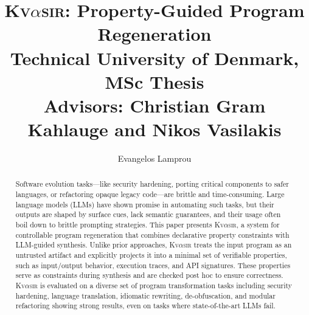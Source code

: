 \documentclass[nonacm,sigplan,review]{acmart}
\newcommand{\sys}{{\scshape Kv{$\alpha$}sir}\xspace}
\begin{document}
\title[Property-Guided Program Regeneration]{\sys: Property-Guided Program Regeneration\\{\vspace{1em}\large Technical University of Denmark, MSc Thesis {\\\vspace{-1em}} Advisors: Christian Gram Kahlauge and Nikos Vasilakis}}
\author{Evangelos Lamprou}



\begin{abstract}
  Software evolution tasks---like security hardening, porting critical components to safer 
  languages, or refactoring opaque legacy code---are brittle and time-consuming.
  Large language models (LLMs) have shown promise in automating such tasks,
  but their outputs are shaped by surface cues, lack
  semantic guarantees, and their usage often boil down to brittle prompting strategies.
This paper presents \sys, a system for controllable program regeneration that
  combines declarative property constraints with LLM-guided synthesis. Unlike
  prior approaches, \sys treats the input program as an untrusted artifact and
  explicitly projects it into a minimal set of verifiable properties, such as
  input/output behavior, execution traces, and API signatures. These properties
  serve as constraints during synthesis and are checked post hoc to ensure
  correctness.
\sys is evaluated on a diverse set of program transformation tasks
including security hardening, language translation, idiomatic rewriting, de-obfuscation,
and modular refactoring showing strong results, even on tasks where state-of-the-art LLMs fail.
\end{abstract}
\maketitle
\end{document}
